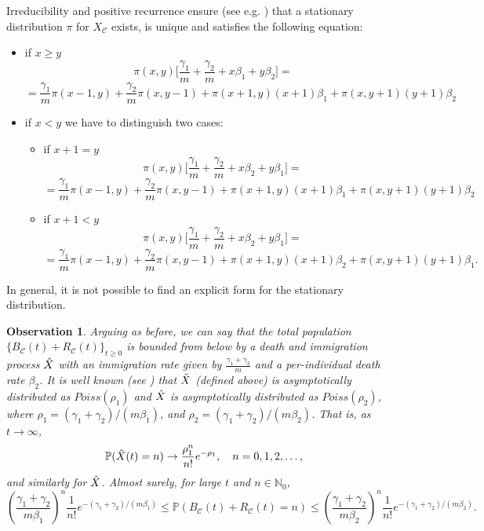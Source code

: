 \documentclass{article}
\newtheorem{observation}{Observation}
\theoremstyle{remark}
\newtheorem*{partial proof}{Partial proof of the Conjecture}
\begin{document}
Irreducibility and positive recurrence ensure (see e.g. \cite[Thm. 15, pg. 301]{grimmett2020probability}) that a stationary distribution $\pi$ for $X_\mathcal{C}$ exists, is unique and satisfies the following equation:
\begin{itemize}
\item if $x \geq y$
$$
\pi(x,y) \Big[ \frac{\gamma_1}{m} + \frac{\gamma_2}{m} + x\beta_1 +y\beta_2 \Big]=
$$
$$
=\frac{\gamma_1}{m} \pi(x-1,y)+ \frac{\gamma_2}{m}\pi(x,y-1)+\pi(x+1,y) (x+1)\beta_1 + \pi(x,y+1)(y+1)\beta_2
$$
\item if $x<y$ we have to distinguish two cases:
\begin{itemize}
    \item[1)] if $x+1=y$
    $$
\pi(x,y) \Big[ \frac{\gamma_1}{m} + \frac{\gamma_2}{m} + x\beta_2 +y\beta_1 \Big]=
$$
$$
=\frac{\gamma_1}{m} \pi(x-1,y)+ \frac{\gamma_2}{m}\pi(x,y-1)+\pi(x+1,y) (x+1)\beta_1 + \pi(x,y+1)(y+1)\beta_2
$$
    \item[2)] if $x+1<y$
    $$
\pi(x,y) \Big[ \frac{\gamma_1}{m} + \frac{\gamma_2}{m} +x\beta_2 +y\beta_1 \Big]=
$$
$$
=\frac{\gamma_1}{m} \pi(x-1,y)+ \frac{\gamma_2}{m}\pi(x,y-1)+\pi(x+1,y) (x+1)\beta_2 + \pi(x,y+1)(y+1)\beta_1.
$$
\end{itemize}
\end{itemize}
In general, it is not possible to find an explicit form for the stationary distribution.

\begin{observation}
\label{Obs1}
Arguing as before, we can say that the total population $\{B_\mathcal{C}(t)+R_\mathcal{C}(t)\}_{t \geq 0}$ is bounded from below by a death and immigration process $\Hat{X}$ with an immigration rate given by $\frac{\gamma_1+\gamma_2}{m}$ and a per-individual death rate $\beta_2$. It is well known (see \cite[Thm. 14 pg. 309]{grimmett2020probability}) that $\Tilde{X}$ (defined above) is asymptotically distributed as $Poiss(\rho_1)$ and $\Hat{X}$ is asymptotically distributed as $Poiss(\rho_2)$, where $\rho_1=(\gamma_1+\gamma_2)/(m\beta_1)$, and $\rho_2=(\gamma_1+\gamma_2)/(m\beta_2)$. That is, as $t \to \infty$,
$$
\mathbb{P}(\Tilde{X}(t)=n) \to \frac{\rho_1^n}{n!}e^{-\rho_1}, \quad n=0,1,2,\dots,
$$
and similarly for $\Hat{X}$.
Almost surely, for large $t$ and $n \in \mathbb{N}_0$,
$$
\left( \frac{\gamma_1+\gamma_2}{m \beta_1}\right)^n \frac{1}{n!} e^{-(\gamma_1+\gamma_2)/(m\beta_1)} \leq \mathbb{P}(B_\mathcal{C}(t)+R_\mathcal{C}(t)=n) \leq \left( \frac{\gamma_1+\gamma_2}{m \beta_2}\right)^n \frac{1}{n!} e^{-(\gamma_1+\gamma_2)/(m\beta_2)}.
$$
\end{observation}
\end{document}
